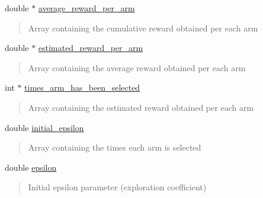 \begin{DoxyCompactItemize}
\mbox{\label{classMultiArmedBandit_acfce3afffc178e1a82e306e874e2a119}} 
double $\ast$ \hyperlink{classMultiArmedBandit_acfce3afffc178e1a82e306e874e2a119}{average\+\_\+reward\+\_\+per\+\_\+arm}
\begin{DoxyCompactList}\small\item\em \begin{quote}
Array containing the cumulative reward obtained per each arm \end{quote}
\end{DoxyCompactList}\item 
\mbox{\label{classMultiArmedBandit_a4237de145039c0431f03df6605209811}} 
double $\ast$ \hyperlink{classMultiArmedBandit_a4237de145039c0431f03df6605209811}{estimated\+\_\+reward\+\_\+per\+\_\+arm}
\begin{DoxyCompactList}\small\item\em \begin{quote}
Array containing the average reward obtained per each arm \end{quote}
\end{DoxyCompactList}\item 
\mbox{\label{classMultiArmedBandit_abf99e54933617eb26b8e6f379fa40df4}} 
int $\ast$ \hyperlink{classMultiArmedBandit_abf99e54933617eb26b8e6f379fa40df4}{times\+\_\+arm\+\_\+has\+\_\+been\+\_\+selected}
\begin{DoxyCompactList}\small\item\em \begin{quote}
Array containing the estimated reward obtained per each arm \end{quote}
\end{DoxyCompactList}\item 
\mbox{\label{classMultiArmedBandit_a88abf95b165c3dd62e3ca5b73a42d3d5}} 
double \hyperlink{classMultiArmedBandit_a88abf95b165c3dd62e3ca5b73a42d3d5}{initial\+\_\+epsilon}
\begin{DoxyCompactList}\small\item\em \begin{quote}
Array containing the times each arm is selected \end{quote}
\end{DoxyCompactList}\item 
\mbox{\label{classMultiArmedBandit_a309a6be7aabef7960add7222d9e5da4d}} 
double \hyperlink{classMultiArmedBandit_a309a6be7aabef7960add7222d9e5da4d}{epsilon}
\begin{DoxyCompactList}\small\item\em \begin{quote}
Initial epsilon parameter (exploration coefficient) \end{quote}
\end{DoxyCompactList}\end{DoxyCompactItemize}


